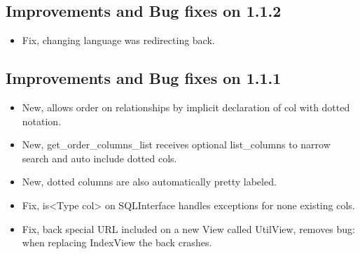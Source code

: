 \documentclass[letterpaper,10pt,english]{sphinxmanual}
\begin{document}
\subsection{Improvements and Bug fixes on 1.1.2}
\label{versions:improvements-and-bug-fixes-on-1-1-2}\begin{itemize}
\item {} 
Fix, changing language was redirecting back.

\end{itemize}


\subsection{Improvements and Bug fixes on 1.1.1}
\label{versions:improvements-and-bug-fixes-on-1-1-1}\begin{itemize}
\item {} 
New, allows order on relationships by implicit declaration of col with dotted notation.

\item {} 
New, get\_order\_columns\_list receives optional list\_columns to narrow search and auto include dotted cols.

\item {} 
New, dotted columns are also automatically pretty labeled.

\item {} 
Fix, is\textless{}Type col\textgreater{} on SQLInterface handles exceptions for none existing cols.

\item {} 
Fix, back special URL included on a new View called UtilView, removes bug: when replacing IndexView the back crashes.

\end{itemize}
\end{document}
